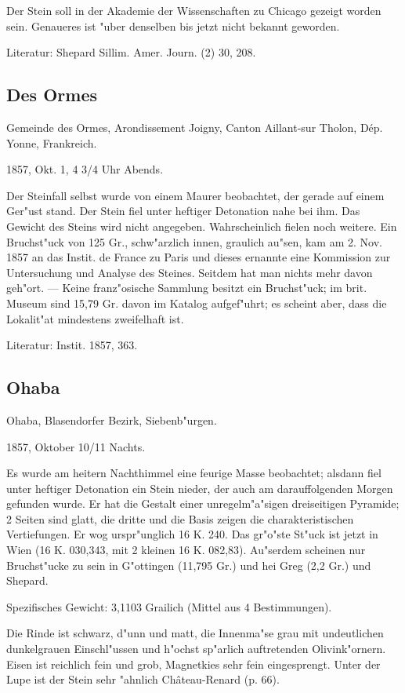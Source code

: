 \documentclass[a4paper, 11pt, oneside]{article}
\begin{document}
Der Stein soll in der Akademie der Wissenschaften zu Chicago gezeigt worden sein. Genaueres ist "uber denselben bis jetzt nicht bekannt geworden.

Literatur: Shepard Sillim. Amer. Journ. (2) 30, 208.

\subsection{Des Ormes}

Gemeinde des Ormes, Arondissement Joigny, Canton Aillant-sur Tholon, Dép. Yonne, Frankreich.

1857, Okt. 1, 4 3/4 Uhr Abends.

Der Steinfall selbst wurde von einem Maurer beobachtet, der gerade auf einem Ger"ust stand. Der Stein fiel unter heftiger Detonation nahe bei ihm. Das Gewicht des Steins wird nicht angegeben. Wahrscheinlich fielen noch weitere. Ein Bruchst"uck von 125 Gr., schw"arzlich innen, graulich au"sen, kam am 2. Nov. 1857 an das Instit. de France zu Paris und dieses ernannte eine Kommission zur Untersuchung und Analyse des Steines. Seitdem hat man nichts mehr davon geh"ort. --- Keine franz"osische Sammlung besitzt ein Bruchst"uck; im brit. Museum sind 15,79 Gr. davon im Katalog aufgef"uhrt; es scheint aber, dass die Lokalit"at mindestens zweifelhaft ist.

Literatur: Instit. 1857, 363.

\subsection{Ohaba}

Ohaba, Blasendorfer Bezirk, Siebenb"urgen.

1857, Oktober 10/11 Nachts.

Es wurde am heitern Nachthimmel eine feurige Masse beobachtet; alsdann fiel unter heftiger Detonation ein Stein nieder, der auch am darauffolgenden Morgen gefunden wurde. Er hat die Gestalt einer unregelm"a"sigen dreiseitigen Pyramide; 2 Seiten sind glatt, die dritte und die Basis zeigen die charakteristischen Vertiefungen. Er wog urspr"unglich 16 K. 240. Das gr"o"ste St"uck ist jetzt in Wien (16 K. 030,343, mit 2 kleinen 16 K. 082,83). Au"serdem scheinen nur Bruchst"ucke zu sein in G"ottingen (11,795 Gr.) und hei Greg (2,2 Gr.) und Shepard.

Spezifisches Gewicht: 3,1103 Grailich (Mittel aus 4 Bestimmungen).

Die Rinde ist schwarz, d"unn und matt, die Innenma"se grau mit undeutlichen dunkelgrauen Einschl"ussen und h"ochst sp"arlich auftretenden Olivink"ornern. Eisen ist reichlich fein und grob, Magnetkies sehr fein eingesprengt. Unter der Lupe ist der Stein sehr "ahnlich Château-Renard (p. 66).
\end{document}
